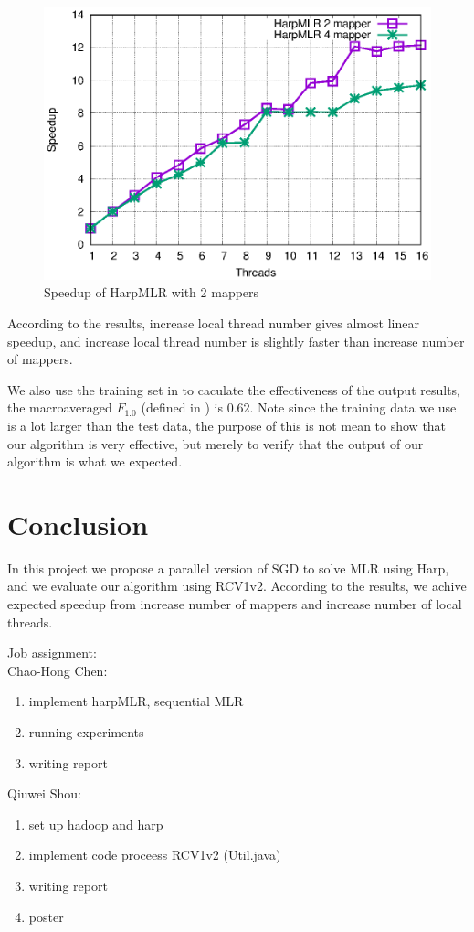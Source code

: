 \documentclass{sig-alternate-05-2015}
\begin{document}
\begin{figure}
  \includegraphics[scale=0.7]{fig/speedup.eps}
  \caption{Speedup of HarpMLR with 2 mappers}
  \label{fig:speedup}
\end{figure}
According to the results, increase local thread number gives almost linear speedup,
and increase local thread number is slightly faster than increase number of mappers.\par
We also use the training set in \cite{Lewis:2004:RNB:1005332.1005345} to caculate the effectiveness of the output results,
the macroaveraged $F_{1.0}$ (defined in \cite{Lewis:1995:EOA:215206.215366}) is $0.62$.
Note since the training data we use is a lot larger than the test data,
the purpose of this is not mean to show that our algorithm is very effective,
but merely to verify that the output of our algorithm is what we expected.

\section{Conclusion}\label{sec:con}
In this project we propose a parallel version of SGD to solve MLR using Harp,
and we evaluate our algorithm using RCV1v2.
According to the results, we achive expected speedup from increase number of mappers and increase number of local threads.




\clearpage
\noindent
Job assignment:\\
Chao-Hong Chen:
\begin{enumerate}
\item implement harpMLR, sequential MLR
\item running experiments
\item writing report
\end{enumerate}
Qiuwei Shou:
\begin{enumerate}
\item set up hadoop and harp
\item implement code proceess RCV1v2 (Util.java)
\item writing report
\item poster
\end{enumerate}
\end{document}
